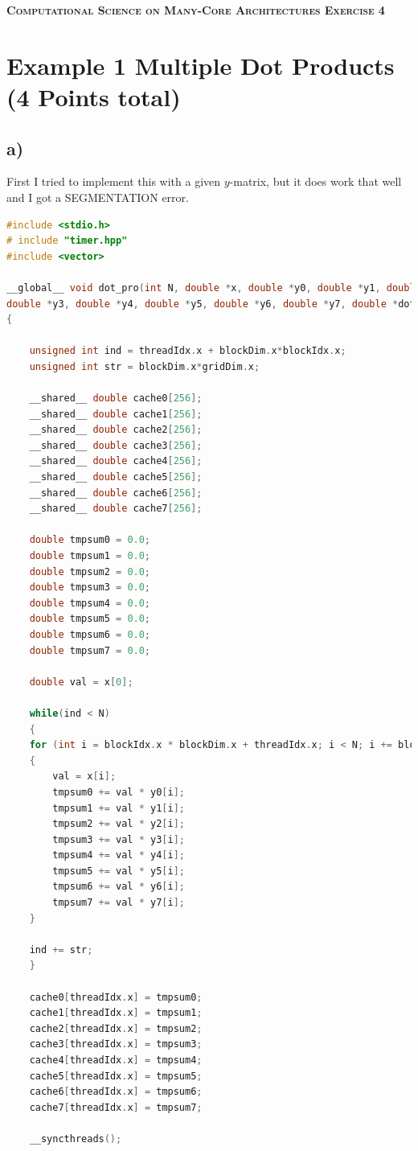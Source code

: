 \documentclass[11pt,a4paper]{article}
\begin{document}
\begin{center}
	\fontsize{24pt}{10pt}\selectfont
	\textsc{\textbf{Computational Science on Many-Core Architectures  Exercise 4}}
\end{center}
\section*{Example 1 Multiple Dot Products (4 Points total)}
\subsection*{a)}
First I tried to implement this with a given $y$-matrix, but it does work that well and I got a SEGMENTATION error.
\begin{lstlisting}[language=C++, caption={kernel for 1a)}]
#include <stdio.h>
# include "timer.hpp"
#include <vector>

__global__ void dot_pro(int N, double *x, double *y0, double *y1, double *y2, 
double *y3, double *y4, double *y5, double *y6, double *y7, double *dot)
{

	unsigned int ind = threadIdx.x + blockDim.x*blockIdx.x;
	unsigned int str = blockDim.x*gridDim.x;

	__shared__ double cache0[256];
	__shared__ double cache1[256];
	__shared__ double cache2[256];
	__shared__ double cache3[256];
	__shared__ double cache4[256];
	__shared__ double cache5[256];
	__shared__ double cache6[256];
	__shared__ double cache7[256];

	double tmpsum0 = 0.0;
	double tmpsum1 = 0.0;
	double tmpsum2 = 0.0;
	double tmpsum3 = 0.0;
	double tmpsum4 = 0.0;
	double tmpsum5 = 0.0;
	double tmpsum6 = 0.0;
	double tmpsum7 = 0.0;

	double val = x[0];

	while(ind < N)
	{
	for (int i = blockIdx.x * blockDim.x + threadIdx.x; i < N; i += blockDim.x * gridDim.x) 
	{
		val = x[i];
		tmpsum0 += val * y0[i];
		tmpsum1 += val * y1[i];
		tmpsum2 += val * y2[i];
		tmpsum3 += val * y3[i];
		tmpsum4 += val * y4[i];
		tmpsum5 += val * y5[i];
		tmpsum6 += val * y6[i];
		tmpsum7 += val * y7[i];
	}
	
	ind += str;
	}

	cache0[threadIdx.x] = tmpsum0;
	cache1[threadIdx.x] = tmpsum1;
	cache2[threadIdx.x] = tmpsum2;
	cache3[threadIdx.x] = tmpsum3;
	cache4[threadIdx.x] = tmpsum4;
	cache5[threadIdx.x] = tmpsum5;
	cache6[threadIdx.x] = tmpsum6;
	cache7[threadIdx.x] = tmpsum7;

	__syncthreads();


\end{lstlisting}
\end{document}
